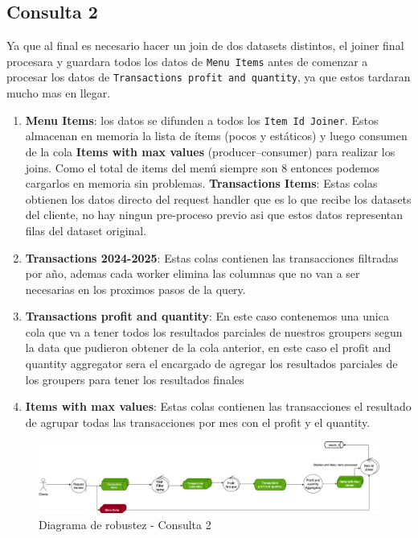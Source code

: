 \documentclass[titlepage,a4paper]{article}
\begin{document}
\subsection*{Consulta 2}
Ya que al final es necesario hacer un join de dos datasets distintos, el joiner final procesara y guardara todos los datos de \texttt{Menu Items} antes de comenzar a procesar los datos de \texttt{Transactions profit and quantity}, ya que estos tardaran mucho mas en llegar.
\begin{enumerate}
    \item \textbf{Menu Items}: los datos se difunden a todos los \texttt{Item Id Joiner}. Estos almacenan en memoria la lista de ítems (pocos y estáticos) y luego consumen de la cola \textbf{Items with max values} (producer--consumer) para realizar los joins. Como el total de items del menú siempre son 8 entonces podemos cargarlos en memoria sin problemas. \newline
    \textbf{Transactions Items}: Estas colas obtienen los datos directo del request handler que es lo que recibe los datasets del cliente, no hay ningun pre-proceso previo asi que estos datos representan filas del dataset original.
    \item \textbf{Transactions 2024-2025}: Estas colas contienen las transacciones filtradas por año, ademas cada worker elimina las columnas que no van a ser necesarias en los proximos pasos de la query.
    \item \textbf{Transactions profit and quantity}: En este caso contenemos una unica cola que va a tener todos los resultados parciales de nuestros groupers segun la data que pudieron obtener de la cola anterior, en este caso el profit and quantity aggregator sera el encargado de agregar los resultados parciales de los groupers para tener los resultados finales
    \item \textbf{Items with max values}: Estas colas contienen las transacciones el resultado de agrupar todas las transacciones por mes con el profit y el quantity.
\end{enumerate}

\begin{figure}[H]
    \centering
    \includegraphics[width=1.0\textwidth]{consulta2.png}
    \caption{Diagrama de robustez - Consulta 2}
\end{figure}
\end{document}
